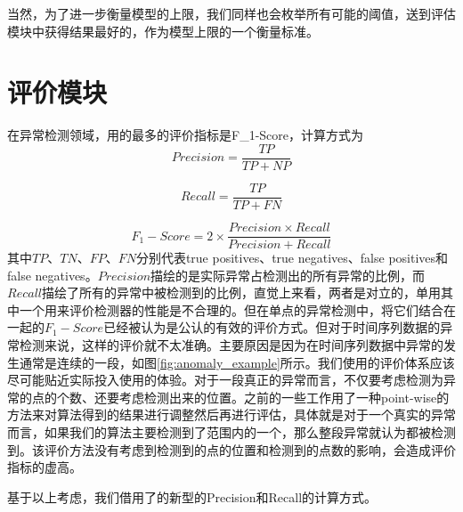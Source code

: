 当然，为了进一步衡量模型的上限，我们同样也会枚举所有可能的阈值，送到评估模块中获得结果最好的，作为模型上限的一个衡量标准。

\section{评价模块}
在异常检测领域，用的最多的评价指标是F\_1-Score，计算方式为
\begin{equation}
  Precision = \frac{TP}{TP + NP}
\end{equation}

\begin{equation}
  Recall = \frac{TP}{TP + FN}
\end{equation}

\begin{equation}
  F_1-Score = 2\times \frac { Precision \times Recall}{Precision + Recall}
\end{equation}
其中$TP$、$TN$、$FP$、$FN$分别代表true positives、true negatives、false positives和 false negatives。$Precision$描绘的是实际异常占检测出的所有异常的比例，而$Recall$描绘了所有的异常中被检测到的比例，直觉上来看，两者是对立的，单用其中一个用来评价检测器的性能是不合理的。但在单点的异常检测中，将它们结合在一起的$F_1-Score$已经被认为是公认的有效的评价方式。但对于时间序列数据的异常检测来说，这样的评价就不太准确。主要原因是因为在时间序列数据中异常的发生通常是连续的一段，如图\ref{fig:anomaly_example}所示。我们使用的评价体系应该尽可能贴近实际投入使用的体验。对于一段真正的异常而言，不仅要考虑检测为异常的点的个数、还要考虑检测出来的位置。之前的一些工作\cite{xu2018unsupervised}\cite{su2019robust}用了一种point-wise的方法来对算法得到的结果进行调整然后再进行评估，具体就是对于一个真实的异常而言，如果我们的算法主要检测到了范围内的一个，那么整段异常就认为都被检测到。该评价方法没有考虑到检测到的点的位置和检测到的点数的影响，会造成评价指标的虚高。

基于以上考虑，我们借用了\cite{tatbul2018precision}的新型的Precision和Recall的计算方式。

